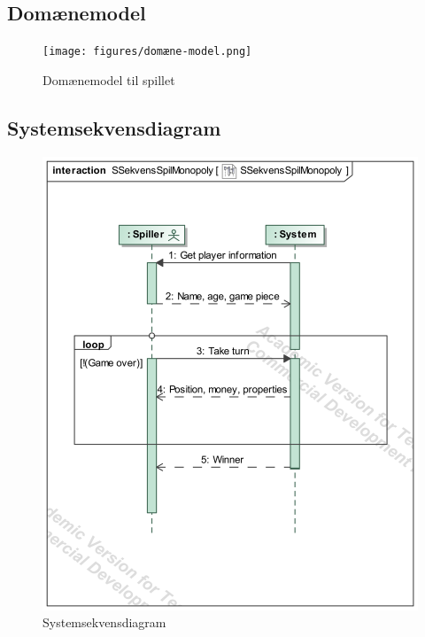 \documentclass[../main.tex]{subfiles}
\begin{document}
\subsection{Domænemodel}
\begin{figure}[H]
    \centering
    \texttt{[image: figures/domæne-model.png]}
    \caption{Domænemodel til spillet}
    \label{fig:domain}
\end{figure}


\subsection{Systemsekvensdiagram}
\TODO
\begin{figure}[H]
    \centering
    \includegraphics[width=0.7\linewidth]{figures/sekvensDiagrammer/SSekvensSpilMonopoly.png}
    \caption{Systemsekvensdiagram}
    \label{fig:systemsekvens}
\end{figure}
\end{document}
